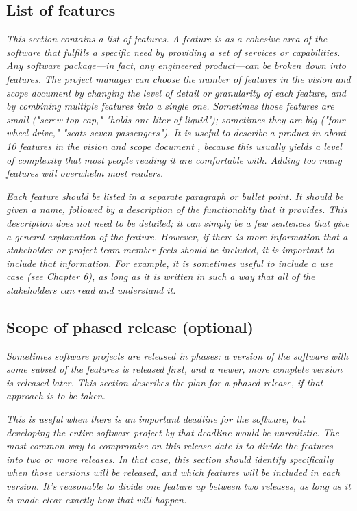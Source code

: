 \documentclass{article}
\begin{document}
\subsection{List of features}

    \textit{This section contains a list of features. A feature is as a
    cohesive area of the software that fulfills a specific need by
    providing a set of services or capabilities. Any software
    package---in fact, any engineered product---can be broken down
    into features. The project manager can choose the number of
    features in the vision and scope document by changing the level of
    detail or granularity of each feature, and by combining multiple
    features into a single one. Sometimes those features are small
    ("screw-top cap," "holds one liter of liquid"); sometimes they are
    big ("four-wheel drive," "seats seven passengers"). It is useful
    to describe a product in about 10 features in the vision and scope
    document , because this usually yields a level of complexity that
    most people reading it are comfortable with. Adding too many
    features will overwhelm most readers.}

    \textit{Each feature should be listed in a separate paragraph or bullet
    point. It should be given a name, followed by a description of the
    functionality that it provides. This description does not need to
    be detailed; it can simply be a few sentences that give a general
    explanation of the feature. However, if there is more information
    that a stakeholder or project team member feels should be
    included, it is important to include that information. For
    example, it is sometimes useful to include a use case (see Chapter
    6), as long as it is written in such a way that all of the
    stakeholders can read and understand it.}

\subsection{Scope of phased release (optional)}

    \textit{Sometimes software projects are released in phases: a version of
    the software with some subset of the features is released first,
    and a newer, more complete version is released later. This section
    describes the plan for a phased release, if that approach is to be
    taken.}

    \textit{This is useful when there is an important deadline for the
    software, but developing the entire software project by that
    deadline would be unrealistic. The most common way to compromise
    on this release date is to divide the features into two or more
    releases. In that case, this section should identify specifically
    when those versions will be released, and which features will be
    included in each version. It's reasonable to divide one feature up
    between two releases, as long as it is made clear exactly how that
    will happen.}
\end{document}

